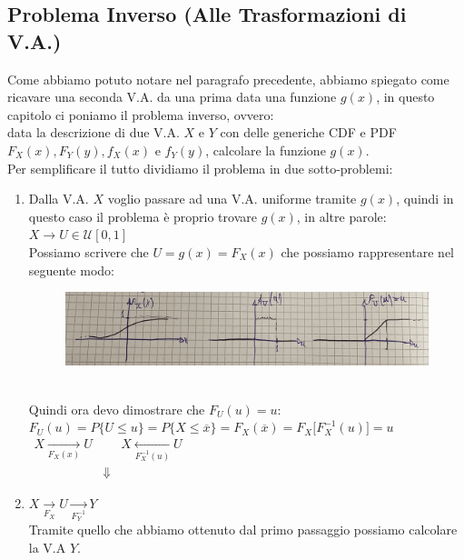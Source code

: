 \documentclass{article}
\begin{document}
\subsection{Problema Inverso (Alle Trasformazioni di V.A.)}
Come abbiamo potuto notare nel paragrafo precedente, abbiamo spiegato come ricavare una seconda V.A. da una prima data una funzione $g(x)$, in questo capitolo ci poniamo il problema inverso, ovvero: \\
data la descrizione di due V.A. $X$ e $Y$ con delle generiche CDF e PDF $F_X(x),F_Y(y),f_X(x) \text{ e } f_Y(y)$, calcolare la funzione $g(x)$. \\
Per semplificare il tutto dividiamo il problema in due sotto-problemi: 
\begin{enumerate}
    \item Dalla V.A. $X$ voglio passare ad una V.A. uniforme tramite $g(x)$, quindi in questo caso il problema è proprio trovare $g(x)$, in altre parole: $X \to U \in \mathcal{U}[0,1]$ \\
    Possiamo scrivere che $U = g(x) = F_X(x)$ che possiamo rappresentare nel seguente modo: 
    \begin{figure}[ht]
    \centering
    \includegraphics[scale=0.13]{images/44.ProblemaInverso.jpeg}
    \end{figure} ~\\
    Quindi ora devo dimostrare che $F_U(u) = u$: \\
    $F_U(u) = P \big\{ U \leq u \big\} = P \big\{ X \leq \overline x \big\} = F_X(\overline x) = F_X \big[ F_X^{-1}(u) \big] = u$ \\
    $\begin{matrix} 
    X \underset{F_X(x)}{\to} U & & X \underset{F^{-1}_X(u)}{\leftarrow} U \\
    & \Downarrow &
    \end{matrix}$
    \item $X \underset{F_X}{\to} U \underset{F^{-1}_{Y}}{\to} Y$ \\
    Tramite quello che abbiamo ottenuto dal primo passaggio possiamo calcolare la V.A $Y$.
\end{enumerate}
\end{document}

